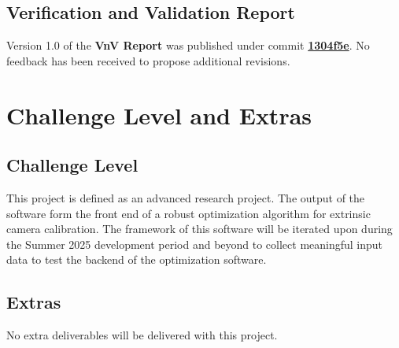 \documentclass{article}
\begin{document}
\subsection{Verification and Validation Report}
\noindent Version 1.0 of the \textbf{VnV Report} was published under commit \href{https://github.com/KiranSingh15/CAS-741-Image-Correspondences/commit/1304f5e68932d94c3aceb8be67cf5ae0bf9e54b5}{\textbf{1304f5e}}. No feedback has been received to propose additional revisions.

\section{Challenge Level and Extras}
\subsection{Challenge Level}
This project is defined as an advanced research project. The output of the \progname{} software form the front end of a robust optimization algorithm for extrinsic camera calibration. The framework of this software will be iterated upon during the Summer 2025 development period and beyond to collect meaningful input data to test the backend of the optimization software.
\subsection{Extras}
No extra deliverables will be delivered with this project.
\end{document}
